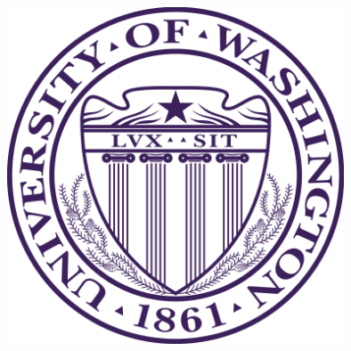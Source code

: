 \documentclass[a0, landscape]{a0poster}
\begin{document}
\begin{minipage}[b]{0.1\linewidth}
\includegraphics[width=10cm]{UWlogo.png}
\end{minipage}

\vspace{0.5cm} %

\end{document}
